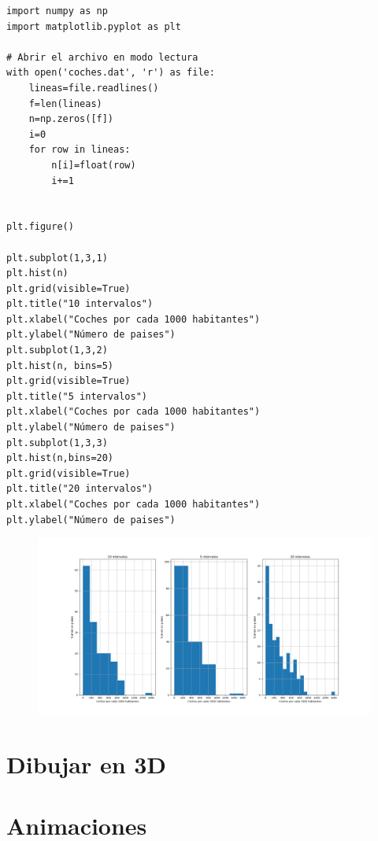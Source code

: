 \begin{verbatim}
import numpy as np
import matplotlib.pyplot as plt

# Abrir el archivo en modo lectura
with open('coches.dat', 'r') as file:
    lineas=file.readlines() 
    f=len(lineas)
    n=np.zeros([f])
    i=0
    for row in lineas:
        n[i]=float(row)
        i+=1


plt.figure()

plt.subplot(1,3,1)
plt.hist(n)
plt.grid(visible=True)
plt.title("10 intervalos")
plt.xlabel("Coches por cada 1000 habitantes")
plt.ylabel("Número de paises")
plt.subplot(1,3,2)
plt.hist(n, bins=5)
plt.grid(visible=True)
plt.title("5 intervalos")
plt.xlabel("Coches por cada 1000 habitantes")
plt.ylabel("Número de paises")
plt.subplot(1,3,3)
plt.hist(n,bins=20)
plt.grid(visible=True)
plt.title("20 intervalos")
plt.xlabel("Coches por cada 1000 habitantes")
plt.ylabel("Número de paises")
\end{verbatim}

\begin{figure}
    \centering
    \includegraphics[width=1\linewidth]{figuras/plt_hist.png}
    \label{fig:plt_hist}
\end{figure}
\section{Dibujar en 3D}
\section{Animaciones}
